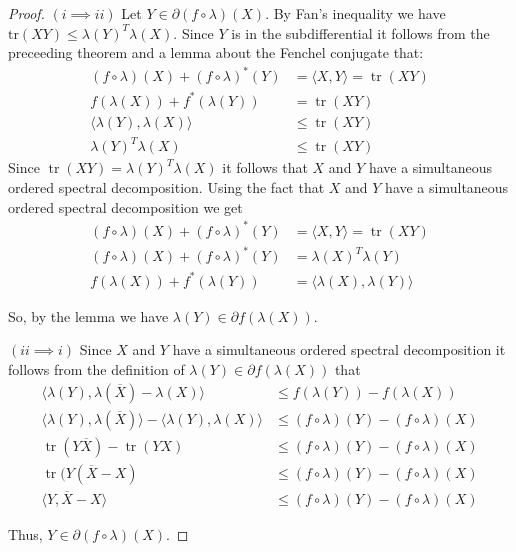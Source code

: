 \begin{proof}
\item $(i \implies ii)$ Let $Y \in \partial (f \circ \lambda)(X)$. By Fan's inequality we have $\mathrm{tr}(XY) \leq \lambda(Y)^T \lambda(X)$. Since $Y$ is in the subdifferential it follows from the preceeding theorem and a lemma about the Fenchel conjugate that:
\begin{align*}
(f \circ \lambda)(X) + (f \circ \lambda)^*(Y) &= \langle X, Y \rangle = \operatorname{tr}(XY) \\
f(\lambda(X)) + f^*(\lambda(Y)) &= \operatorname{tr}(XY) \\
\langle \lambda(Y), \lambda(X) \rangle &\leq \operatorname{tr}(XY) \\
\lambda(Y)^T \lambda(X) &\leq \operatorname{tr}(XY)
\end{align*}
Since $\operatorname{tr}(XY) = \lambda(Y)^T \lambda(X)$ it follows that $X$ and $Y$ have a simultaneous ordered spectral decomposition. Using the fact that $X$ and $Y$ have a simultaneous ordered spectral decomposition we get
\begin{align*}
(f \circ \lambda)(X) + (f \circ \lambda)^*(Y) &= \langle X, Y \rangle = \operatorname{tr}(XY) \\
(f \circ \lambda)(X) + (f \circ \lambda)^*(Y) &= \lambda(X)^T \lambda(Y) \\
f(\lambda(X)) + f^*(\lambda(Y)) &= \langle \lambda(X), \lambda(Y) \rangle
\end{align*}

So, by the lemma we have $\lambda(Y) \in \partial f(\lambda(X))$.

\item $(ii \implies i)$ Since $X$ and $Y$ have a simultaneous ordered spectral decomposition it follows from the definition of $\lambda(Y) \in \partial f(\lambda(X))$ that
\begin{align*}
\langle \lambda(Y), \lambda(\overline{X}) - \lambda(X) \rangle &\leq f(\lambda(Y)) - f(\lambda(X)) \\
\langle \lambda(Y), \lambda(\overline{X}) \rangle - \langle \lambda(Y), \lambda(X) \rangle &\leq (f \circ \lambda)(Y) - (f \circ \lambda)(X) \\
\operatorname{tr}(Y\overline{X}) - \operatorname{tr}(YX) &\leq (f \circ \lambda)(Y) - (f \circ \lambda)(X) \\
\operatorname{tr}(Y(\overline{X} - X) &\leq (f \circ \lambda)(Y) - (f \circ \lambda)(X) \\
\langle Y, \overline{X} - X \rangle &\leq (f \circ \lambda)(Y) - (f \circ \lambda)(X)
\end{align*}

Thus, $Y \in \partial (f \circ \lambda)(X)$.

\end{proof}
